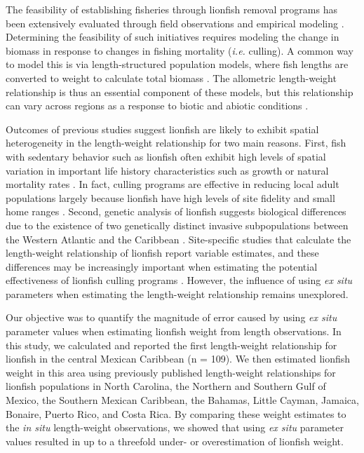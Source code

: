 \documentclass[fleqn,10pt,lineno]{wlpeerj} %
\begin{document}
The feasibility of establishing fisheries through lionfish removal
programs has been extensively evaluated through field observations and
empirical modeling
\citep{barbour_2011,morris_2011,deleon_2013,johnston_2015,sandel_2015,usseglio_2017}.
Determining the feasibility of such initiatives requires modeling the
change in biomass in response to changes in fishing mortality
(\emph{i.e.} culling). A common way to model this is via
length-structured population models, where fish lengths are converted to
weight to calculate total biomass
\citep{barbour_2011,cote_2014,andradibrown_2017}. The allometric
length-weight relationship is thus an essential component of these
models, but this relationship can vary across regions as a response to
biotic and abiotic conditions \citep{johnson_2016}.

Outcomes of previous studies suggest lionfish are likely to exhibit
spatial heterogeneity in the length-weight relationship for two main
reasons. First, fish with sedentary behavior such as lionfish often
exhibit high levels of spatial variation in important life history
characteristics such as growth or natural mortality rates
\citep{gunderson_2008,hutchinson_2008,wilson_2012,guan_2013}. In fact,
culling programs are effective in reducing local adult populations
largely because lionfish have high levels of site fidelity and small
home ranges \citep{Fishelson_1997,kochzius_2005,jud_2012,cote_2014}.
Second, genetic analysis of lionfish suggests biological differences due
to the existence of two genetically distinct invasive subpopulations
between the Western Atlantic and the Caribbean \citep{betancurr_2011}.
Site-specific studies that calculate the length-weight relationship of
lionfish report variable estimates, and these differences may be
increasingly important when estimating the potential effectiveness of
lionfish culling programs
\citep{barbour_2011,morris_2011,cote_2014,johnston_2015}. However, the
influence of using \emph{ex situ} parameters when estimating the
length-weight relationship remains unexplored.

Our objective was to quantify the magnitude of error caused by using
\emph{ex situ} parameter values when estimating lionfish weight from
length observations. In this study, we calculated and reported the first
length-weight relationship for lionfish in the central Mexican Caribbean
(n = 109). We then estimated lionfish weight in this area using
previously published length-weight relationships for lionfish
populations in North Carolina, the Northern and Southern Gulf of Mexico,
the Southern Mexican Caribbean, the Bahamas, Little Cayman, Jamaica,
Bonaire, Puerto Rico, and Costa Rica. By comparing these weight
estimates to the \emph{in situ} length-weight observations, we showed
that using \emph{ex situ} parameter values resulted in up to a threefold
under- or overestimation of lionfish weight.
\end{document}
